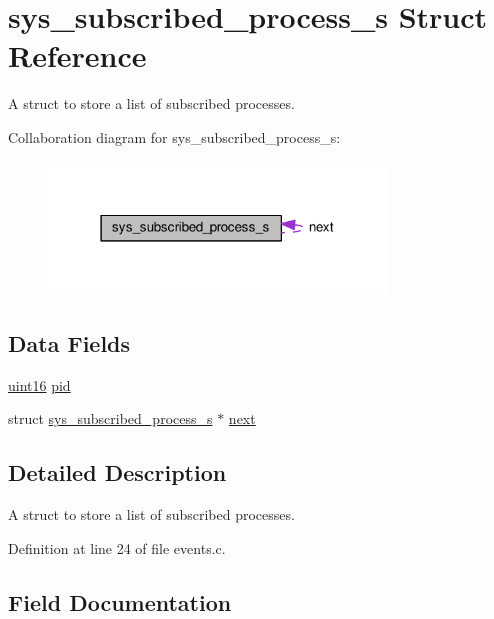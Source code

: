 \hypertarget{structsys__subscribed__process__s}{}\section{sys\+\_\+subscribed\+\_\+process\+\_\+s Struct Reference}
\label{structsys__subscribed__process__s}


A struct to store a list of subscribed processes.  




Collaboration diagram for sys\+\_\+subscribed\+\_\+process\+\_\+s\+:\nopagebreak
\begin{figure}[H]
\begin{center}
\leavevmode
\includegraphics[width=255pt]{d8/d74/structsys__subscribed__process__s__coll__graph}
\end{center}
\end{figure}
\subsection*{Data Fields}
\begin{DoxyCompactItemize}
\item 
\hyperlink{definitions_8h_a05f6b0ae8f6a6e135b0e290c25fe0e4e}{uint16} \hyperlink{structsys__subscribed__process__s_a94e62af7fee25e53ea6c81cbb311783d}{pid}
\item 
struct \hyperlink{structsys__subscribed__process__s}{sys\+\_\+subscribed\+\_\+process\+\_\+s} $\ast$ \hyperlink{structsys__subscribed__process__s_abcf0ef070dc4fd0ba7165dfae52d7316}{next}
\end{DoxyCompactItemize}


\subsection{Detailed Description}
A struct to store a list of subscribed processes. 

Definition at line 24 of file events.\+c.



\subsection{Field Documentation}
\hypertarget{structsys__subscribed__process__s_abcf0ef070dc4fd0ba7165dfae52d7316}{}
